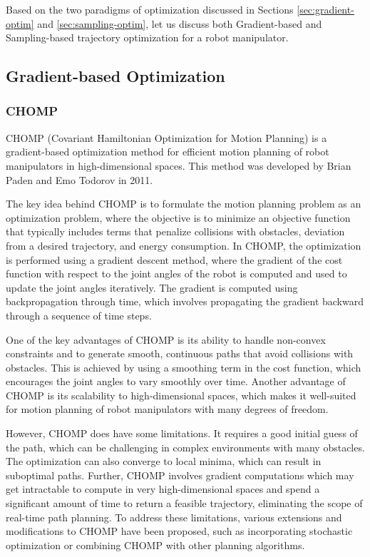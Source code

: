Based on the two paradigms of optimization discussed in Sections \ref{sec:gradient-optim} and \ref{sec:sampling-optim}, let us discuss both Gradient-based and Sampling-based trajectory optimization for a robot manipulator.

\subsection{Gradient-based Optimization}\label{sec:bg-gradient-manipulator}

\subsubsection{CHOMP}\label{sec:CHOMP}

CHOMP (Covariant Hamiltonian Optimization for Motion Planning)\cite{CHOMP} is a gradient-based optimization method for efficient motion planning of robot manipulators in high-dimensional spaces. This method was developed by Brian Paden and Emo Todorov in 2011.

The key idea behind CHOMP is to formulate the motion planning problem as an optimization problem, where the objective is to minimize an objective function that typically includes terms that penalize collisions with obstacles, deviation from a desired trajectory, and energy consumption. In CHOMP, the optimization is performed using a gradient descent method, where the gradient of the cost function with respect to the joint angles of the robot is computed and used to update the joint angles iteratively. The gradient is computed using backpropagation through time, which involves propagating the gradient backward through a sequence of time steps.

One of the key advantages of CHOMP is its ability to handle non-convex constraints and to generate smooth, continuous paths that avoid collisions with obstacles. This is achieved by using a smoothing term in the cost function, which encourages the joint angles to vary smoothly over time. Another advantage of CHOMP is its scalability to high-dimensional spaces, which makes it well-suited for motion planning of robot manipulators with many degrees of freedom.

However, CHOMP does have some limitations. It requires a good initial guess of the path, which can be challenging in complex environments with many obstacles. The optimization can also converge to local minima, which can result in suboptimal paths. Further, CHOMP involves gradient computations which may get intractable to compute in very high-dimensional spaces and spend a significant amount of time to return a feasible trajectory, eliminating the scope of real-time path planning. To address these limitations, various extensions and modifications to CHOMP have been proposed, such as incorporating stochastic optimization or combining CHOMP with other planning algorithms.


